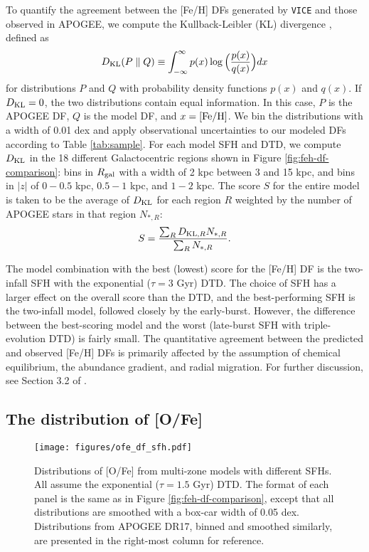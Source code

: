 \documentclass[twocolumn,twocolappendix,linenumbers,trackchanges]{aastex631}
\newcommand{\vice}{{\tt VICE}\xspace}
\begin{document}
To quantify the agreement between the [Fe/H] DFs generated by \vice and those observed in APOGEE, we compute the Kullback-Leibler (KL) divergence \citep{KullbackLeibler1951}, defined as
\begin{equation}
    D_{\rm{KL}}(P \parallel Q) \equiv \int_{-\infty}^{\infty} p(x) \log\Big(\frac{p(x)}{q(x)}\Big) dx
    \label{eq:kl-divergence}
\end{equation}
for distributions $P$ and $Q$ with probability density functions $p(x)$ and $q(x)$. If $D_{\rm KL}=0$, the two distributions contain equal information. In this case, $P$ is the APOGEE DF, $Q$ is the model DF, and $x={\rm [Fe/H]}$. We bin the distributions with a width of 0.01 dex and apply observational uncertainties to our modeled DFs according to Table \ref{tab:sample}. For each model SFH and DTD, we compute $D_{\rm{KL}}$ in the 18 different Galactocentric regions shown in Figure \ref{fig:feh-df-comparison}: bins in $R_{\rm gal}$ with a width of 2 kpc between 3 and 15 kpc, and bins in $|z|$ of $0-0.5$ kpc, $0.5-1$ kpc, and $1-2$ kpc. The score $S$ for the entire model is taken to be the average of $D_{\rm{KL}}$ for each region $R$ weighted by the number of APOGEE stars in that region $N_{*,R}$:
\begin{equation}
    S = \frac{\sum_R D_{{\rm KL},R} N_{*,R}}{\sum_R N_{*,R}}.
    \label{eq:feh-df-score}
\end{equation}

The model combination with the best (lowest) score for the [Fe/H] DF is the two-infall SFH with the exponential ($\tau=3$ Gyr) DTD. The choice of SFH has a larger effect on the overall score than the DTD, and the best-performing SFH is the two-infall model, followed closely by the early-burst. However, the difference between the best-scoring model and the worst (late-burst SFH with triple-evolution DTD) is fairly small. The quantitative agreement between the predicted and observed [Fe/H] DFs is primarily affected by the assumption of chemical equilibrium, the abundance gradient, and radial migration. For further discussion, see Section 3.2 of .

\subsection{The distribution of [O/Fe]}
\label{sec:ofe-df}

\begin{figure*}
    \centering
    \texttt{[image: figures/ofe\_df\_sfh.pdf]}
    \caption{Distributions of [O/Fe] from multi-zone models with different SFHs. All assume the exponential ($\tau=1.5$ Gyr) DTD. The format of each panel is the same as in Figure \ref{fig:feh-df-comparison}, except that all distributions are smoothed with a box-car width of 0.05 dex. Distributions from APOGEE DR17, binned and smoothed similarly, are presented in the right-most column for reference.}
    \label{fig:ofe-df-sfh}
\end{figure*}
\end{document}
